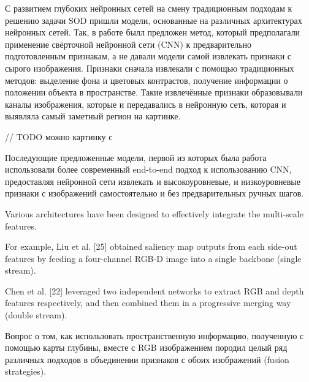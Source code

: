 С развитием глубоких нейронных сетей на смену традиционным подходам к решению задачи SOD пришли модели, основанные на различных архитектурах нейронных сетей.
Так, в работе \cite{RGBD-SOD-Deep-Fusion} былл предложен метод, который предполагали применение свёрточной нейронной сети (CNN) к предварительно подготовленным признакам, а не давали модели самой извлекать признаки 
с сырого изображения. Признаки сначала извлекали с помощью традиционных методов: выделение фона и цветовых контрастов, 
получение информации о положении объекта в пространстве. Такие извлечённые признаки образовывали каналы изображения, которые и передавались в нейронную сеть, которая 
и выявляла самый заметный регион на картинке. 

// TODO можно картинку с  \cite{RGBD-SOD-Deep-Fusion}

Последующие предложенные модели, первой из которых была работа \cite{CNNs-Based} использовали более современный end-to-end подход к использованию CNN, предоставляя нейронной сети извлекать 
и высокоуровневые, и низкоуровневые признаки с изображений самостоятельно и без предварительных ручных шагов.

Various architectures have been designed to effectively
integrate the multi-scale features. 

For example, Liu et al. [25]
obtained saliency map outputs from each side-out features
by feeding a four-channel RGB-D image into a single backbone (single stream).


Chen et al. [22] leveraged two independent networks to extract RGB and depth features respectively, and then combined them in a progressive merging
way (double stream). 



Вопрос о том, как использовать пространственную информацию, полученную с помощью карты глубины, вместе с RGB изображением породил целый ряд
различных подходов в объединении признаков с обоих изображений (fusion strategies). 